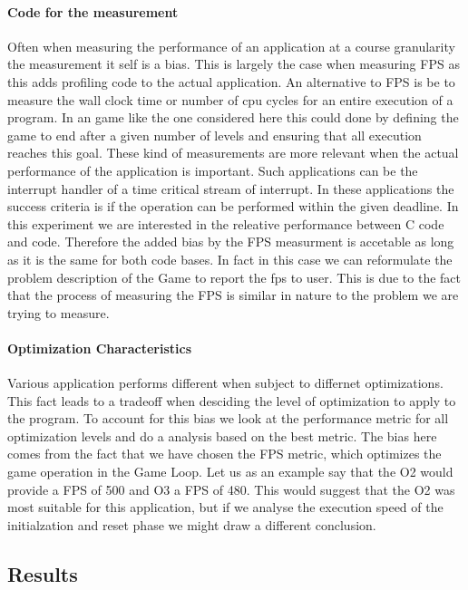 \paragraph{Code for the measurement}
Often when measuring the performance of an application at a course granularity the measurement it self is a bias.
This is largely the case when measuring FPS as this adds profiling code to the actual application.
An alternative to FPS is be to measure the wall clock time or number of cpu cycles for an entire execution of a program.
In an game like the one considered here this could done by defining the game to end after a given number of levels and ensuring that all execution reaches this goal.
These kind of measurements are more relevant when the actual performance of the application is important.
Such applications can be the interrupt handler of a time critical stream of interrupt.
In these applications the success criteria is if the operation can be performed within the given deadline.
In this experiment we are interested in the releative performance between C code and {\rust} code.
Therefore the added bias by the FPS measurment is accetable as long as it is the same for both code bases.
In fact in this case we can reformulate the problem description of the Game to report the fps to user.
This is due to the fact that the process of measuring the FPS is similar in nature to the problem we are trying to measure.

\paragraph{Optimization Characteristics}
Various application performs different when subject to differnet optimizations.
This fact leads to a tradeoff when desciding the level of optimization to apply to the program.
To account for this bias we look at the performance metric for all optimization levels and do a analysis based on the best metric.
The bias here comes from the fact that we have chosen the FPS metric, which optimizes the game operation in the Game Loop.
Let us as an example say that the O2 would provide a FPS of 500 and O3 a FPS of 480.
This would suggest that the O2 was most suitable for this application, but if we analyse the execution speed of the initialzation and reset phase we might draw a different conclusion.

\subsection{Results}
\label{sec:perf:res}


